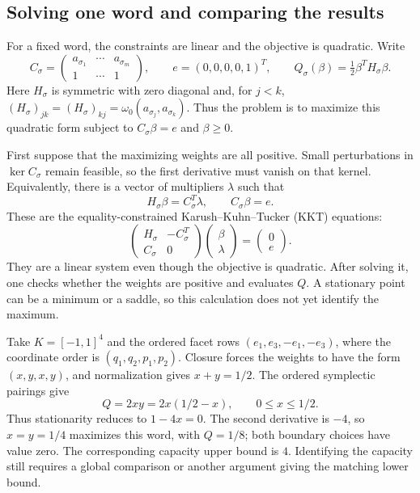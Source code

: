\subsection{Solving one word and comparing the results}
\label{subsec:quadratic-program-algorithm-hk2019-computation-layers}

For a fixed word, the constraints are linear and the objective is quadratic.
Write
\[
 C_\sigma=
 \begin{pmatrix}
 a_{\sigma_1}&\cdots&a_{\sigma_m}\\1&\cdots&1
 \end{pmatrix},\qquad e=(0,0,0,0,1)^T,\qquad
 Q_\sigma(\beta)=\tfrac12\beta^T H_\sigma\beta.
\]
Here $H_\sigma$ is symmetric with zero diagonal and, for $j<k$,
$(H_\sigma)_{jk}=(H_\sigma)_{kj}=\omega_0(a_{\sigma_j},a_{\sigma_k})$.
Thus the problem is to maximize this quadratic form subject to
$C_\sigma\beta=e$ and $\beta\geq0$.

First suppose that the maximizing weights are all positive. Small
perturbations in $\ker C_\sigma$ remain feasible, so the first derivative
must vanish on that kernel. Equivalently, there is a vector of multipliers
$\lambda$ such that
\[
 H_\sigma\beta=C_\sigma^T\lambda,\qquad C_\sigma\beta=e.
\]
These are the equality-constrained Karush--Kuhn--Tucker (KKT) equations:
\begin{equation}\label{eq:qp-stationary-system}
 \begin{pmatrix}H_\sigma&-C_\sigma^T\\C_\sigma&0\end{pmatrix}
 \begin{pmatrix}\beta\\\lambda\end{pmatrix}
 =\begin{pmatrix}0\\e\end{pmatrix}.
\end{equation}
They are a linear system even though the objective is quadratic. After
solving it, one checks whether the weights are positive and evaluates $Q$.
A stationary point can be a minimum or a saddle, so this calculation does
not yet identify the maximum.

\begin{example}
Take $K=[-1,1]^4$ and the ordered facet rows
$(e_1,e_3,-e_1,-e_3)$, where the coordinate order is
$(q_1,q_2,p_1,p_2)$. Closure forces the weights to have the form
$(x,y,x,y)$, and normalization gives $x+y=1/2$. The ordered symplectic
pairings give
\[
 Q=2xy=2x(1/2-x),\qquad 0\leq x\leq1/2.
\]
Thus stationarity reduces to $1-4x=0$. The second derivative is $-4$,
so $x=y=1/4$ maximizes this word, with $Q=1/8$; both boundary choices
have value zero. The corresponding capacity upper bound is $4$.
Identifying the capacity still requires a global
comparison or another argument giving the matching lower bound.
\end{example}

